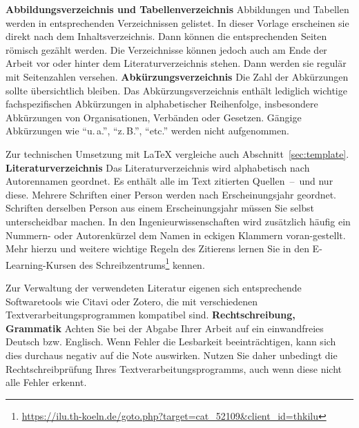 %
%
\textbf{Abbildungsverzeichnis und Tabellenverzeichnis}
Abbildungen und Tabellen werden in entsprechenden Verzeichnissen gelistet. In dieser Vorlage erscheinen sie direkt nach dem Inhaltsverzeichnis. Dann können die entsprechenden Seiten römisch gezählt werden. Die Verzeichnisse können jedoch auch am Ende der Arbeit vor oder hinter dem Literaturverzeichnis stehen. Dann werden sie regulär mit Seitenzahlen versehen.
%
%
\textbf{Abkürzungsverzeichnis}
Die Zahl der Abkürzungen sollte übersichtlich bleiben. Das Abkürzungsverzeichnis enthält lediglich wichtige fachspezifischen Abkürzungen in alphabetischer Reihenfolge, insbesondere Abkürzungen von Organisationen, Verbänden oder Gesetzen. Gängige Abkürzungen wie \enquote{u.\,a.}, \enquote{z.\,B.}, \enquote{etc.} werden nicht aufgenommen.
\par
Zur technischen Umsetzung mit \LaTeX{} vergleiche auch Abschnitt~\ref{sec:template}.
%
%
\textbf{Literaturverzeichnis}
Das Literaturverzeichnis wird alphabetisch nach Autorennamen geordnet. Es enthält alle im Text zitierten Quellen~--~und nur diese. Mehrere Schriften einer Person werden nach Erscheinungsjahr geordnet. Schriften derselben Person aus einem Erscheinungsjahr müssen Sie selbst unterscheidbar machen. In den Ingenieurwissenschaften wird zusätzlich häufig ein Nummern- oder Autorenkürzel dem Namen in eckigen Klammern voran-gestellt. Mehr hierzu und weitere wichtige Regeln des Zitierens lernen Sie in den E-Learning-Kursen des Schreibzentrums\footnote{\href{https://ilu.th-koeln.de/goto.php?target=cat\_52109\&client\_id=thkilu}{https://ilu.th-koeln.de/goto.php?target=cat\_52109\&client\_id=thkilu}} kennen.
\par
Zur Verwaltung der verwendeten Literatur eigenen sich entsprechende Softwaretools wie Citavi oder Zotero, die mit verschiedenen Textverarbeitungsprogrammen kompatibel sind.
%
%
\textbf{Rechtschreibung, Grammatik}
Achten Sie bei der Abgabe Ihrer Arbeit auf ein einwandfreies Deutsch bzw. Englisch. Wenn Fehler die Lesbarkeit beeinträchtigen, kann sich dies durchaus negativ auf die Note auswirken. Nutzen Sie daher unbedingt die Rechtschreibprüfung Ihres Textverarbeitungsprogramms, auch wenn diese nicht alle Fehler erkennt.
